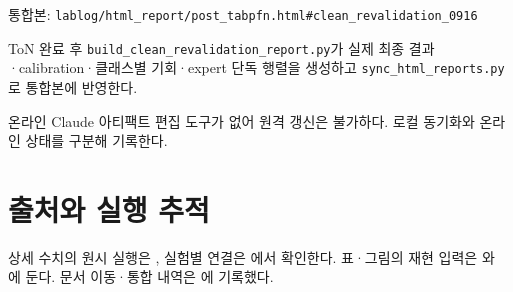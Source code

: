 \par\noindent \textbullet\enspace 통합본: \texttt{lablog/\allowbreak{}\allowbreak{}h\allowbreak{}tml\_\allowbreak{}\allowbreak{}repo\allowbreak{}rt/\allowbreak{}\allowbreak{}post\_\allowbreak{}\allowbreak{}tabpfn.\allowbreak{}h\allowbreak{}tml\#clea\allowbreak{}n\_\allowbreak{}\allowbreak{}revali\allowbreak{}dation\_\allowbreak{}\allowbreak{}0\allowbreak{}916}


\par\noindent \textbullet\enspace ToN 완료 후 \texttt{build\_\allowbreak{}\allowbreak{}cl\allowbreak{}ean\_\allowbreak{}\allowbreak{}reva\allowbreak{}lidation\allowbreak{}\_\allowbreak{}\allowbreak{}report.\allowbreak{}py}가 실제 최종 결과·calibration·클래스별 기회·expert 단독 행렬을 생성하고 \texttt{sync\_\allowbreak{}\allowbreak{}htm\allowbreak{}l\_\allowbreak{}\allowbreak{}report\allowbreak{}s.\allowbreak{}py}로 통합본에 반영한다.


\par\noindent \textbullet\enspace 온라인 Claude 아티팩트 편집 도구가 없어 원격 갱신은 불가하다. 로컬 동기화와 온라인 상태를 구분해 기록한다.




\section*{출처와 실행 추적}

상세 수치의 원시 실행은 , 실험별 연결은 에서 확인한다. 표·그림의 재현 입력은 와 에 둔다. 문서 이동·통합 내역은 에 기록했다.


